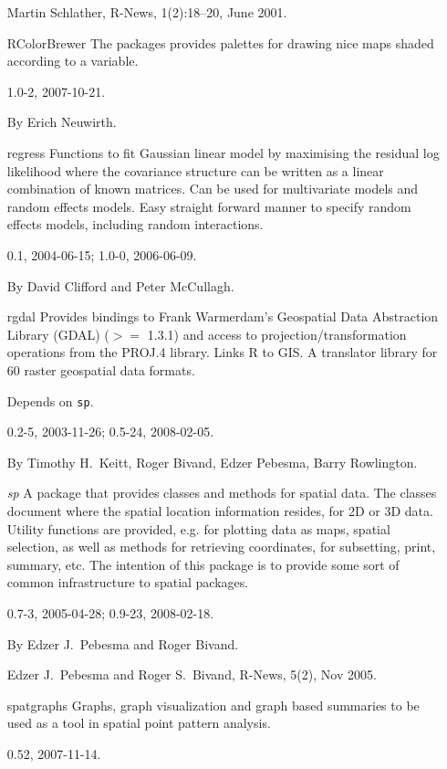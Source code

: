 \documentclass[12pt]{article}
\begin{document}
\begin{itemize}
Martin Schlather, R-News, 1(2):18--20, June 2001.

\item[RColorBrewer]
The packages provides palettes for drawing nice maps shaded according to
a variable.

1.0-2, 2007-10-21.

By Erich Neuwirth.

\item[regress]
Functions to fit Gaussian linear model by maximising the residual log
likelihood where the covariance structure can be written as a linear
combination of known matrices. Can be used for multivariate models and
random effects models. Easy straight forward manner to specify random
effects models, including random interactions.

0.1, 2004-06-15; 1.0-0, 2006-06-09.

By David Clifford and Peter McCullagh.

\item[rgdal]
Provides bindings to Frank Warmerdam's Geospatial Data Abstraction
Library (GDAL) ($>=$ 1.3.1) and access to projection/transformation
operations from the PROJ.4 library.
Links R to GIS.
A translator library for 60 raster geospatial data formats.

Depends on \texttt{sp}.

0.2-5, 2003-11-26; 0.5-24, 2008-02-05.

By Timothy H.\ Keitt, Roger Bivand, Edzer Pebesma, Barry Rowlington.

\item[\emph{sp}]
A package that provides classes and methods for spatial data. The
classes document where the spatial location information resides, for 2D
or 3D data. Utility functions are provided, e.g. for plotting data as
maps, spatial selection, as well as methods for retrieving coordinates,
for subsetting, print, summary, etc.
The intention of this package is to provide some sort of common
infrastructure to spatial packages.

0.7-3, 2005-04-28; 0.9-23, 2008-02-18.

By Edzer J.\ Pebesma and Roger Bivand.

Edzer J.\ Pebesma and Roger S.\ Bivand, R-News, 5(2), Nov 2005.

\item[spatgraphs]
Graphs, graph visualization and graph based summaries to be used as a
tool in spatial point pattern analysis.

0.52, 2007-11-14.


\end{itemize}
\end{document}
